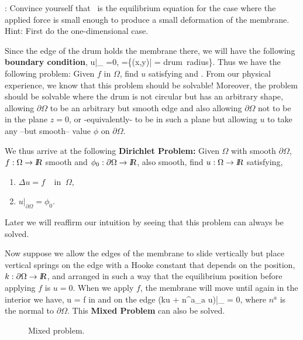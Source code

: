 \ejer:
Convince yourself that~ is the equilibrium equation for the case where the applied force is small enough to produce a small deformation of the membrane.
Hint: First do the one-dimensional case.

Since the edge of the drum holds the membrane there, we will have the following {\bf boundary condition},
\beq 
u|_{\partial \Omega} =0, \;\; \partial \Omega=\{(x,y)\;|\;  = 
\mbox{drum radius}\}.
\label{ec3*}
\eeq
Thus we have the following problem: Given $f$ in $\Omega$, find $u$ satisfying
 and .
From our physical experience, we know that this problem should be solvable! Moreover, the problem should be solvable where the drum is not circular but has an arbitrary shape, allowing $\partial \Omega$ to be an arbitrary but smooth edge and also allowing $\partial \Omega$ not to be in the plane $z=0$, or -equivalently- to be in such a plane but allowing $u$ to take any --but smooth-- value $\phi$ on $\partial \Omega$.

We thus arrive at the following {\bf Dirichlet Problem:} 
Given $\Omega$ with smooth $\partial \Omega$, $f :\Omega \rightarrow \mbox{\sl {l$\!\!\!\;\:\!$R}}$ smooth and
$\phi_0: \partial \Omega \rightarrow \mbox{\sl {l$\!\!\!\;\:\!$R}}$, also smooth, find 
$u:\Omega \rightarrow \mbox{\sl {l$\!\!\!\;\:\!$R}}$ satisfying,
\begin{enumerate}
\item $ \Delta u = f \;\;\;\;\mbox{in}\;\;\Omega$,
\item $u|_{\partial \Omega} = \phi_0.$
\end{enumerate}
Later we will reaffirm our intuition by seeing that this problem can always be solved.

Now suppose we allow the edges of the membrane to slide vertically but place vertical springs on the edge with a Hooke constant that depends on the position, $k:\partial \Omega \rightarrow \mbox{\sl {l$\!\!\!\;\:\!$R}}$, and arranged in such a way that the equilibrium position before applying $f$ is $u=0$. When we apply $f$, the membrane will move until again in the interior we have,
\beq \Delta u = f \;\;\;\;\mbox{in}\;\;\Omega \eeq
and on the edge
\beq
(ku + n^a\nabla_a u)|_{\partial \Omega} = 0,
\eeq
where $n^a$ is the normal to $\partial \Omega$. 
This {\bf Mixed Problem} can also be solved. 
\begin{figure}[htbp]
  \begin{center}
    \caption{Mixed problem.}
    \label{fig:12_2}
  \end{center}
\end{figure}

